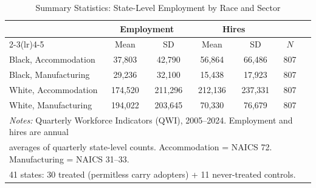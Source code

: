 \begin{table}[t]
\centering
\caption{Summary Statistics: State-Level Employment by Race and Sector}
\label{tab:summary}
\begin{tabular}{lcccccc}
\hline\hline
 & \multicolumn{2}{c}{Employment} & \multicolumn{2}{c}{Hires} & \\
\cmidrule(lr){2-3}\cmidrule(lr){4-5}
 & Mean & SD & Mean & SD & $N$ \\
\hline
Black, Accommodation & 37,803 & 42,790 & 56,864 & 66,486 & 807 \\
Black, Manufacturing & 29,236 & 32,100 & 15,438 & 17,923 & 807 \\
White, Accommodation & 174,520 & 211,296 & 212,136 & 237,331 & 807 \\
White, Manufacturing & 194,022 & 203,645 & 70,330 & 76,679 & 807 \\
\hline
\multicolumn{6}{l}{\footnotesize \textit{Notes:} Quarterly Workforce Indicators (QWI), 2005--2024. Employment and hires are annual} \\
\multicolumn{6}{l}{\footnotesize averages of quarterly state-level counts. Accommodation = NAICS 72. Manufacturing = NAICS 31--33.} \\
\multicolumn{6}{l}{\footnotesize 41 states: 30 treated (permitless carry adopters) + 11 never-treated controls.} \\
\hline\hline
\end{tabular}
\end{table}


